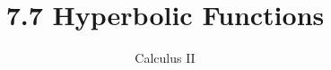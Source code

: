 \documentclass{article}
\begin{document}
\title{7.7 Hyperbolic Functions}
\author{Calculus II}
\date{}
\maketitle

\end{document}

